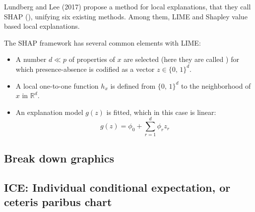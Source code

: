 Lundberg and Lee (2017) propose a method for local explanations, that they call
SHAP (), unifying six existing methods.
Among them, LIME and Shapley value based local explanations.

The SHAP framework has several common elements with LIME:
\begin{itemize}
    \item A number $d \ll p$ of properties of $x$ are selected (here they are called
        ) for which presence-absence is codified
        as a vector $z \in \{0,\,1\}^d$.
    \item A local one-to-one function $h_x$ is defined from $\{0,\,1\}^d$ to the
        neighborhood of $x$ in $\mathds R^d$.
    \item An explanation model $g(z)$ is fitted, which in this case is linear:
        \begin{equation*}
            g(z) = \phi_0 + \sum_{r = 1}^d \phi_r z_r
        \end{equation*}
\end{itemize}

\subsection{Break down graphics}
\subsection{ICE: Individual conditional expectation, or ceteris paribus chart}
